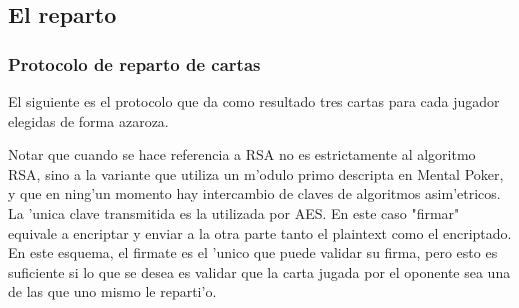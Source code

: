 \subsection{El reparto}
\subsubsection{Protocolo de reparto de cartas}
El siguiente es el protocolo que da como resultado tres cartas para cada jugador elegidas de forma azaroza.


Notar que cuando se hace referencia a RSA no es estrictamente al algoritmo RSA, sino a la variante que utiliza un m'odulo primo descripta en Mental Poker, y que en ning'un momento hay intercambio de claves de algoritmos asim'etricos. La 'unica clave transmitida es la utilizada por AES.
En este caso "firmar" equivale a encriptar y enviar a la otra parte tanto el plaintext como el encriptado. En este esquema, el firmate es el 'unico que puede validar su firma, pero esto es suficiente si lo que se desea es validar que la carta jugada por el oponente sea una de las que uno mismo le reparti'o.


